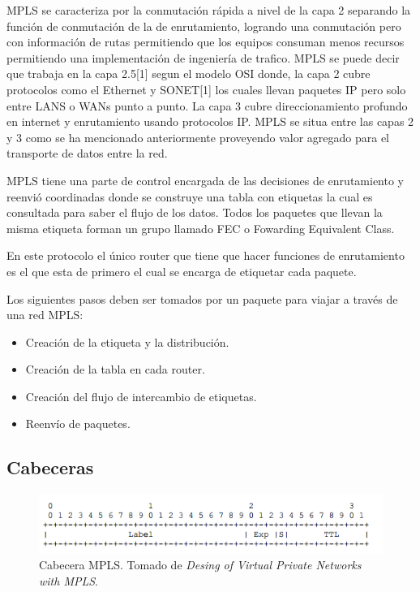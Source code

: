 \documentclass[10pt,journal,compsoc]{IEEEtran}
\begin{document}
MPLS se caracteriza por la conmutación rápida a nivel de la capa 2 separando la función de conmutación de la de enrutamiento, logrando una conmutación pero con información de rutas permitiendo que los equipos consuman menos recursos permitiendo una implementación de ingeniería de trafico. MPLS se puede decir  que trabaja en la capa 2.5[1] segun el modelo OSI donde, la capa 2 cubre protocolos como el Ethernet y SONET[1] los cuales llevan paquetes IP pero solo entre LANS o WANs punto a punto. La capa 3 cubre direccionamiento profundo en internet y enrutamiento usando protocolos IP. MPLS se situa entre las capas 2 y 3 como se ha mencionado anteriormente proveyendo valor agregado para el transporte de datos entre la red.

MPLS tiene una parte de control encargada de las decisiones de enrutamiento y reenvió coordinadas donde se construye una tabla con etiquetas la cual es consultada para saber el flujo de los datos. Todos los paquetes que llevan la misma etiqueta forman un grupo llamado FEC o Fowarding Equivalent Class.

En este protocolo el único router que tiene que hacer funciones de enrutamiento es el que esta de primero el cual se encarga de etiquetar cada paquete.


Los siguientes pasos deben ser tomados por un paquete para viajar a través de una red MPLS:

\begin{itemize}
  \item Creación de la etiqueta y la distribución. 
  \item Creación de la tabla en cada router.
  \item Creación del flujo de intercambio de etiquetas.
  \item Reenvío de paquetes.
\end{itemize}
\subsection{Cabeceras}


\begin{figure}[h]
    \center
    \includegraphics[width=15cm]{cabecera}
    \caption{Cabecera MPLS. Tomado de  \emph{Desing of Virtual Private Networks with MPLS}\cite{rexford}.}
    \label{fig:tradicitional-architecture}
\end{figure}
\end{document}
